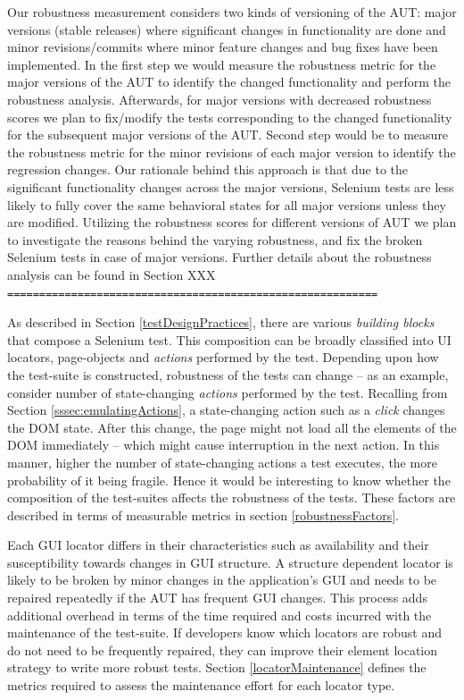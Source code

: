 Our robustness measurement considers two kinds of versioning of the AUT: major versions (stable releases) where significant changes in functionality are done and minor revisions/commits where minor feature changes and bug fixes have been implemented.  In the first step we would measure the robustness metric for the major versions of the AUT to identify the changed functionality and perform the robustness analysis. Afterwards, for major versions with decreased robustness scores we plan to fix/modify the tests corresponding to the changed functionality for the subsequent major versions of the AUT. Second step would be to measure the robustness metric for the minor revisions of each major version to identify the regression changes. Our rationale behind this approach is that due to the significant functionality changes across the major versions, Selenium tests are less likely to fully cover the same behavioral states for all major versions unless they are modified. Utilizing the robustness scores for different versions of AUT we plan to investigate the reasons behind the varying robustness, and fix the broken Selenium tests in case of major versions. Further details about the robustness analysis  can be found in Section XXX
\texttt{==========================================================}

As described in Section \ref{testDesignPractices}, there are various \textit{building blocks} that compose a Selenium test. This composition can be broadly classified into UI locators, page-objects and \textit{actions} performed by the test. Depending upon how the test-suite is constructed, robustness of the tests can change -- as an example, consider number of state-changing \textit{actions} performed by the test. Recalling from Section \ref{sssec:emulatingActions}, a state-changing action such as a \textit{click} changes the DOM state. After this change, the page might not load all the elements of the DOM immediately -- which might cause interruption in the next action. In this manner, higher the number of state-changing actions a test executes, the more probability of it being fragile. Hence it would be interesting to know whether the composition of the test-suites affects the robustness of the tests. These factors are described in terms of measurable metrics in section \ref{robustnessFactors}.

Each GUI locator differs in their characteristics such as availability and their susceptibility towards changes in GUI structure. A structure dependent locator is likely to be broken by minor changes in the application's GUI and needs to be repaired repeatedly if the AUT has frequent GUI changes. This process adds additional overhead in terms of the time required and costs incurred with the maintenance of the test-suite. If developers know which locators are robust and do not need to be frequently repaired, they can improve their element location strategy to write more robust tests. Section \ref{locatorMaintenance} defines the metrics required to assess the maintenance effort for each locator type. 

